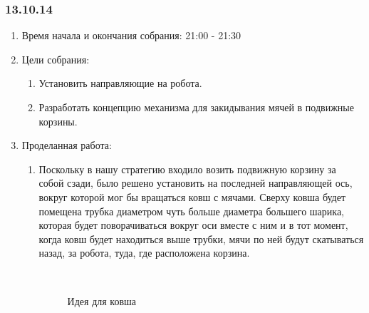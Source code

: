 
\subsubsection{13.10.14}

\begin{enumerate}
	\item Время начала и окончания собрания:
	21:00 - 21:30
	\item Цели собрания:
	\begin{enumerate}
	  \item Установить направляющие на робота.
	  
	  \item Разработать концепцию механизма для закидывания мячей в подвижные корзины.
	  
    \end{enumerate}
	\item Проделанная работа:
	\begin{enumerate}
	  \item Поскольку в нашу стратегию входило возить подвижную корзину за собой сзади, было решено установить на последней направляющей ось, вокруг которой мог бы вращаться ковш с мячами. Сверху ковша будет помещена трубка диаметром чуть больше диаметра большего шарика, которая будет поворачиваться вокруг оси вместе с ним и в тот момент, когда ковш будет находиться выше трубки, мячи по ней будут скатываться назад, за робота, туда, где расположена корзина.
	  
	  \begin{figure}[H]
	  	\begin{minipage}[h]{0.2\linewidth}
	  		\center  
	  	\end{minipage}
	  	\begin{minipage}[h]{0.6\linewidth}
	  		\caption{Идея для ковша}
	  	\end{minipage}
	  \end{figure}
      

\end{enumerate}
\end{enumerate}
